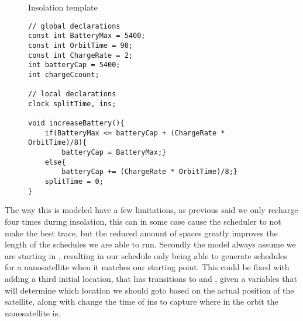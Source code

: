 \begin{figure}[H]
	\centering
	\caption{Insolation template}
	\label{fig:cora_inso}
\end{figure}

\begin{figure}[H]
	\begin{lstlisting}[language=my_c, caption={Declarations and function}, label=lst:insolation_code]
// global declarations
const int BatteryMax = 5400;
const int OrbitTime = 90;
const int ChargeRate = 2;
int batteryCap = 5400;
int chargeCcount;

// local declarations
clock splitTime, ins;

void increaseBattery(){
	if(BatteryMax <= batteryCap + (ChargeRate * OrbitTime)/8){
		batteryCap = BatteryMax;}
	else{
		batteryCap += (ChargeRate * OrbitTime)/8;}
	splitTime = 0;
}
	\end{lstlisting}
\end{figure}

The way this is modeled have a few limitations, as previous said we only recharge four times during insolation, this can in some case cause the scheduler to not make the best trace, but the reduced amount of spaces greatly improves the length of the schedules we are able to run. Secondly the model always assume we are starting in , resulting in our schedule only being able to generate schedules for a nanosatellite when it matches our starting point. This could be fixed with adding a third initial location, that has transitions to  and , given a variables that will determine which location we should goto based on the actual position of the satellite, along with change the time of ins to capture where in the orbit the nanosatellite is. 


